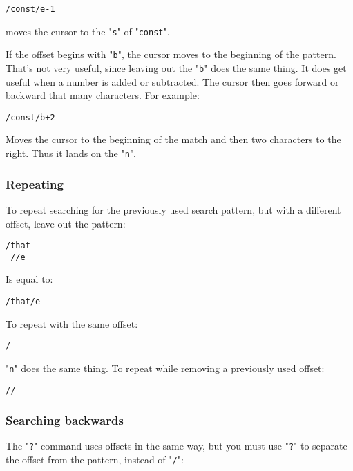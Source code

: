 \begin{Verbatim}[samepage=true]
 /const/e-1
\end{Verbatim}

moves the cursor to the "\texttt{s}" of "\texttt{const}".

If the offset begins with "\texttt{b}", the cursor moves to the beginning of the pattern.
That's not very useful, since leaving out the "\texttt{b}" does the same thing.
It does get useful when a number is added or subtracted.
The cursor then goes forward or backward that many characters.
For example:

\begin{Verbatim}[samepage=true]
 /const/b+2
\end{Verbatim}

Moves the cursor to the beginning of the match and then two characters to the right.
Thus it lands on the "\texttt{n}".

\subsubsection{Repeating}
To repeat searching for the previously used search pattern, but with a different offset, leave out the pattern:

\begin{Verbatim}[samepage=true]
 /that
 //e
\end{Verbatim}

Is equal to:

\begin{Verbatim}[samepage=true]
 /that/e
\end{Verbatim}

To repeat with the same offset:

\begin{Verbatim}[samepage=true]
 /
\end{Verbatim}

"\texttt{n}" does the same thing.
To repeat while removing a previously used offset:

\begin{Verbatim}[samepage=true]
 //
\end{Verbatim}

\subsubsection{Searching backwards}
The "\texttt{?}" command uses offsets in the same way, but you must use "\texttt{?}" to separate the offset from the pattern, instead of "\texttt{/}":

